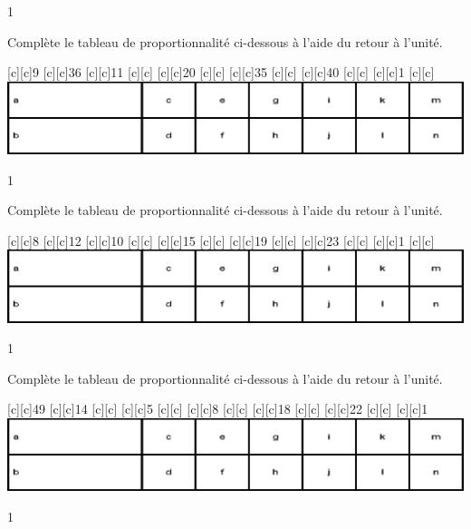 \documentclass[a4paper,11pt]{report}
\begin{document}
\begin{resolu}
{}{1}
\end{resolu}

\newpage
\begin{exop}{
Complète le tableau de proportionnalité ci-dessous à l'aide du retour à l'unité.
\begin{center}
[c][c]{9}
[c][c]{36}
[c][c]{11}
[c][c]{}
[c][c]{20}
[c][c]{}
[c][c]{35}
[c][c]{}
[c][c]{40}
[c][c]{}
[c][c]{{\color{blue}1}}
[c][c]{}
\includegraphics[scale=.9]{media/fa-30/tableaut.eps}
\end{center}
\vspace{-0.5cm}}{1}
\end{exop}


\begin{exop}{
Complète le tableau de proportionnalité ci-dessous à l'aide du retour à l'unité.
\begin{center}
[c][c]{8}
[c][c]{12}
[c][c]{10}
[c][c]{}
[c][c]{15}
[c][c]{}
[c][c]{19}
[c][c]{}
[c][c]{23}
[c][c]{}
[c][c]{{\color{blue}1}}
[c][c]{}
\includegraphics[scale=.9]{media/fa-30/tableaut.eps}
\end{center}
\vspace{-0.5cm}}{1}
\end{exop}

\begin{exop}{
Complète le tableau de proportionnalité ci-dessous à l'aide du retour à l'unité.
\begin{center}
[c][c]{49}
[c][c]{14}
[c][c]{}
[c][c]{5}
[c][c]{}
[c][c]{8}
[c][c]{}
[c][c]{18}
[c][c]{}
[c][c]{22}
[c][c]{}
[c][c]{{\color{blue}1}}
\includegraphics[scale=.9]{media/fa-30/tableaut.eps}
\end{center}
\vspace{-0.5cm}}{1}
\end{exop}
\end{document}
